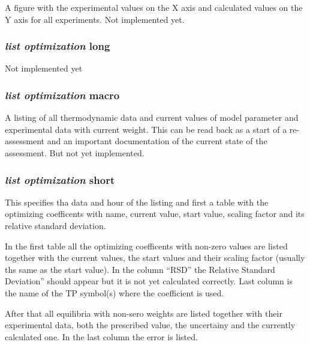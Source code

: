 \documentclass[11pt]{article}
\begin{document}
A figure with the experimental values on the X axis and calculated values
on the Y axis for all experiments.  Not implemented yet.

\hypertarget{List optimization long}{}
\subsubsection{{\em list optimization} long}

Not implemented yet

\hypertarget{List optimization macro}{}
\subsubsection{{\em list optimization} macro}

A listing of all thermodynamic data and current values of model
parameter and experimental data with current weight.  This can be read
back as a start of a re-assessment and an important documentation of
the current state of the assessment.  But not yet implemented.

\hypertarget{List optimization short}{}
\subsubsection{{\em list optimization} short}\label{sc:listoptshort}

This specifies tha data and hour of the listing and first a table with
the optimizing coefficents with name, current value, start value,
scaling factor and its relative standard deviation.

In the first table all the optimizing coefficents with non-zero values
are listed together with the current values, the start values and
their scaling factor (usually ths same as the start value).  In the
column ``RSD'' the Relative Standard Deviation'' should appear but it
is not yet calculated correctly.  Last column is the name of the TP
symbol(s) where the coefficient is used.

After that all equilibria with non-sero weights are listed together
with their experimental data, both the prescribed value, the
uncertainy and the currently calculated one.  In the last column the
error is listed.
\end{document}

